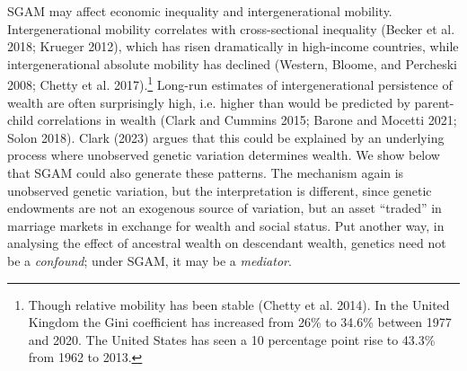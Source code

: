 \documentclass[
  12pt,
]{article}
\theoremstyle{definition}
\theoremstyle{definition}
\theoremstyle{definition}
\theoremstyle{definition}
\theoremstyle{remark}
\begin{document}
SGAM may affect economic inequality and intergenerational mobility.
Intergenerational mobility correlates with cross-sectional inequality
(Becker et al. 2018; Krueger 2012), which has risen dramatically in
high-income countries, while intergenerational absolute mobility has declined
(Western, Bloome, and Percheski 2008; Chetty et al. 2017).\footnote{Though relative mobility has been stable (Chetty et al. 2014). In the
  United Kingdom the Gini coefficient has increased from 26\% to 34.6\% between 1977
  and 2020. The United States has seen a 10 percentage point rise to 43.3\%
  from 1962 to 2013.} Long-run estimates of
intergenerational persistence of wealth are often surprisingly high, i.e.
higher than would be predicted by parent-child correlations in wealth
(Clark and Cummins 2015; Barone and Mocetti 2021; Solon 2018). Clark (2023) argues that this could be explained by an
underlying process where unobserved genetic variation determines wealth. We
show below that SGAM could also generate these patterns. The mechanism again is
unobserved genetic variation, but the interpretation is different, since genetic
endowments are not an exogenous source of variation, but an asset ``traded'' in
marriage markets in exchange for wealth and social status. Put another way, in
analysing the effect of ancestral wealth on descendant wealth, genetics need
not be a \emph{confound}; under SGAM, it may be a \emph{mediator}.
\end{document}
